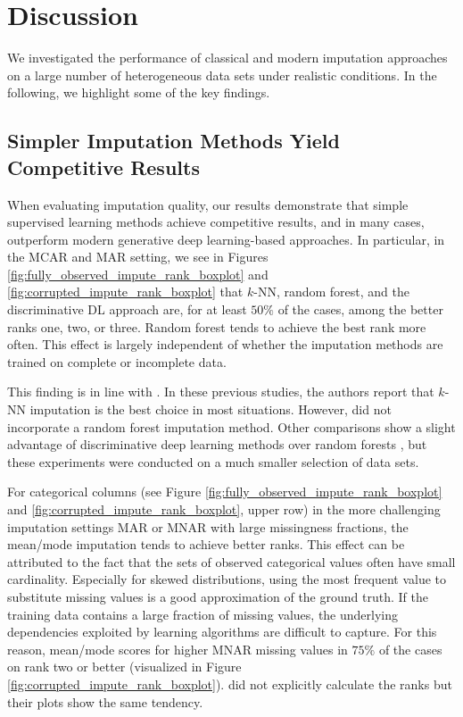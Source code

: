 \section{Discussion}
\label{sec:discussion}

We investigated the performance of classical and modern imputation approaches on a large number of heterogeneous data sets under realistic conditions. In the following, we highlight some of the key findings.

\subsection{Simpler Imputation Methods Yield Competitive Results}
%
When evaluating imputation quality, our results demonstrate that simple supervised learning methods achieve competitive results, and in many cases, outperform modern generative deep learning-based approaches. In particular, in the MCAR and MAR setting, we see in Figures \ref{fig:fully_observed_impute_rank_boxplot} and \ref{fig:corrupted_impute_rank_boxplot} that $k$-NN, random forest, and the discriminative DL approach are, for at least $50\%$ of the cases, among the better ranks one, two, or three. Random forest tends to achieve the best rank more often. This effect is largely independent of whether the imputation methods are trained on complete or incomplete data.

This finding is in line with \cite{Imputation_Benchmark_3, Imputation_Benchmark_2, Imputation_Benchmark_4}. In these previous studies, the authors report that $k$-NN imputation is the best choice in most situations. However, \cite{Imputation_Benchmark_2, Imputation_Benchmark_4} did not incorporate a random forest imputation method. Other comparisons show a slight advantage of discriminative deep learning methods over random forests \citep{biessmann2019datawig}, but these experiments were conducted on a much smaller selection of data sets.

For categorical columns (see Figure \ref{fig:fully_observed_impute_rank_boxplot} and \ref{fig:corrupted_impute_rank_boxplot}, upper row) in the more challenging imputation settings MAR or MNAR with large missingness fractions, the mean/mode imputation tends to achieve better ranks. This effect can be attributed to the fact that the sets of observed categorical values often have small cardinality. Especially for skewed distributions, using the most frequent value to substitute missing values is a good approximation of the ground truth. If the training data contains a large fraction of missing values, the underlying dependencies exploited by learning algorithms are difficult to capture. For this reason, mean/mode scores for higher MNAR missing values in $75\%$ of the cases on rank two or better (visualized in Figure \ref{fig:corrupted_impute_rank_boxplot}). \cite{Imputation_Benchmark_3} did not explicitly calculate the ranks but their plots show the same tendency.

